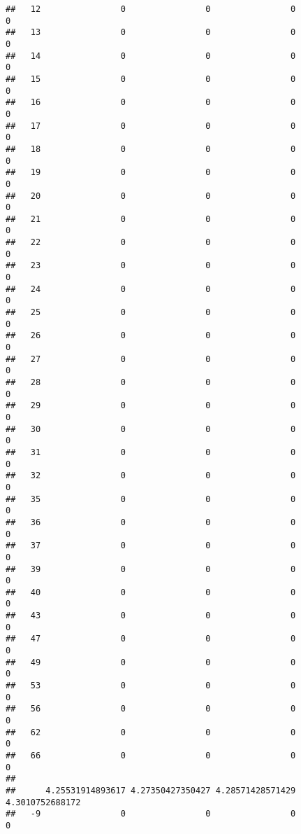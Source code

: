 \documentclass[]{article}
\begin{document}
\begin{verbatim}
##   12                0                0                0                0
##   13                0                0                0                0
##   14                0                0                0                0
##   15                0                0                0                0
##   16                0                0                0                0
##   17                0                0                0                0
##   18                0                0                0                0
##   19                0                0                0                0
##   20                0                0                0                0
##   21                0                0                0                0
##   22                0                0                0                0
##   23                0                0                0                0
##   24                0                0                0                0
##   25                0                0                0                0
##   26                0                0                0                0
##   27                0                0                0                0
##   28                0                0                0                0
##   29                0                0                0                0
##   30                0                0                0                0
##   31                0                0                0                0
##   32                0                0                0                0
##   35                0                0                0                0
##   36                0                0                0                0
##   37                0                0                0                0
##   39                0                0                0                0
##   40                0                0                0                0
##   43                0                0                0                0
##   47                0                0                0                0
##   49                0                0                0                0
##   53                0                0                0                0
##   56                0                0                0                0
##   62                0                0                0                0
##   66                0                0                0                0
##     
##      4.25531914893617 4.27350427350427 4.28571428571429 4.3010752688172
##   -9                0                0                0               0

\end{verbatim}
\end{document}
